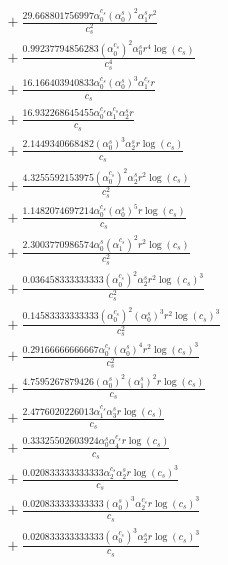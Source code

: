 \documentclass[10pt]{article}
\begin{document}
\begin{align*}
&{}  + \frac{29.668801756997 \alpha_{0}^{c_s} \left(\alpha_{0}^s\right)^{2} \alpha_{1}^s r^{2}}{c_{s}^{2}} \\
&{}  + \frac{0.99237794856283 \left(\alpha_{0}^{c_s}\right)^{2} \alpha_{0}^s r^{4} \log{\left(c_{s} \right)}}{c_{s}^{4}} \\
&{}  + \frac{16.166403940833 \alpha_{0}^{c_s} \left(\alpha_{0}^s\right)^{3} \alpha_{1}^{c_s} r}{c_{s}} \\
&{}  + \frac{16.932268645455 \alpha_{0}^{c_s} \alpha_{1}^{c_s} \alpha_{2}^s r}{c_{s}} \\
&{}  + \frac{2.1449340668482 \left(\alpha_{0}^s\right)^{3} \alpha_{2}^s r \log{\left(c_{s} \right)}}{c_{s}} \\
&{}  + \frac{4.3255592153975 \left(\alpha_{0}^{c_s}\right)^{2} \alpha_{2}^s r^{2} \log{\left(c_{s} \right)}}{c_{s}^{2}} \\
&{}  + \frac{1.1482074697214 \alpha_{0}^{c_s} \left(\alpha_{0}^s\right)^{5} r \log{\left(c_{s} \right)}}{c_{s}} \\
&{}  + \frac{2.3003770986574 \alpha_{0}^s \left(\alpha_{1}^{c_s}\right)^{2} r^{2} \log{\left(c_{s} \right)}}{c_{s}^{2}} \\
&{}  + \frac{0.036458333333333 \left(\alpha_{0}^{c_s}\right)^{2} \alpha_{2}^s r^{2} \log{\left(c_{s} \right)}^{3}}{c_{s}^{2}} \\
&{}  + \frac{0.14583333333333 \left(\alpha_{0}^{c_s}\right)^{2} \left(\alpha_{0}^s\right)^{3} r^{2} \log{\left(c_{s} \right)}^{3}}{c_{s}^{2}} \\
&{}  + \frac{0.29166666666667 \alpha_{0}^{c_s} \left(\alpha_{0}^s\right)^{4} r^{2} \log{\left(c_{s} \right)}^{3}}{c_{s}^{2}} \\
&{}  + \frac{4.7595267879426 \left(\alpha_{0}^s\right)^{2} \left(\alpha_{1}^s\right)^{2} r \log{\left(c_{s} \right)}}{c_{s}} \\
&{}  + \frac{2.4776020226013 \alpha_{1}^{c_s} \alpha_{3}^s r \log{\left(c_{s} \right)}}{c_{s}} \\
&{}  + \frac{0.33325502603924 \alpha_{0}^s \alpha_{4}^{c_s} r \log{\left(c_{s} \right)}}{c_{s}} \\
&{}  + \frac{0.020833333333333 \alpha_{2}^{c_s} \alpha_{2}^s r \log{\left(c_{s} \right)}^{3}}{c_{s}} \\
&{}  + \frac{0.020833333333333 \left(\alpha_{0}^s\right)^{3} \alpha_{2}^{c_s} r \log{\left(c_{s} \right)}^{3}}{c_{s}} \\
&{}  + \frac{0.020833333333333 \left(\alpha_{0}^{c_s}\right)^{3} \alpha_{2}^s r \log{\left(c_{s} \right)}^{3}}{c_{s}} \\

\end{align*}
\end{document}
